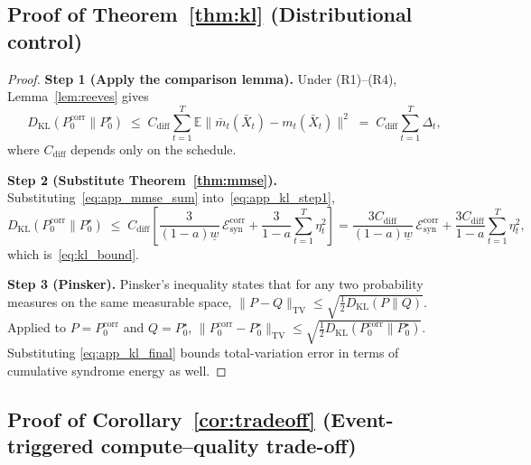 \documentclass{article}
\theoremstyle{plain}
\theoremstyle{definition}
\theoremstyle{remark}
\begin{document}
\subsection{Proof of Theorem~\ref{thm:kl} (Distributional control)}
\label{app:thm_kl}

\begin{proof}
\textbf{Step 1 (Apply the comparison lemma).}
Under (R1)--(R4), Lemma~\ref{lem:reeves} gives
\begin{equation}
D_{\mathrm{KL}}(P_0^{\mathrm{corr}} \| P_0^\star)
\;\le\; C_{\mathrm{diff}} \sum_{t=1}^T
\mathbb{E}\|\bar m_t(\bar X_t) - m_t(\bar X_t)\|^2
\;=\; C_{\mathrm{diff}}\sum_{t=1}^T \Delta_t,
\label{eq:app_kl_step1}
\end{equation}
where \(C_{\mathrm{diff}}\) depends only on the schedule.

\textbf{Step 2 (Substitute Theorem~\ref{thm:mmse}).}
Substituting~\eqref{eq:app_mmse_sum} into~\eqref{eq:app_kl_step1},
\begin{equation}
D_{\mathrm{KL}}(P_0^{\mathrm{corr}} \| P_0^\star)
\;\le\; C_{\mathrm{diff}}\!
  \left[\frac{3}{(1-a)\underline w}\,\mathcal{E}^{\mathrm{corr}}_{\mathrm{syn}}
  + \frac{3}{1-a}\sum_{t=1}^T \eta_t^2\right]
= \frac{3C_{\mathrm{diff}}}{(1-a)\underline w}\,\mathcal{E}^{\mathrm{corr}}_{\mathrm{syn}}
 + \frac{3C_{\mathrm{diff}}}{1-a}\sum_{t=1}^T \eta_t^2,
\label{eq:app_kl_final}
\end{equation}
which is~\eqref{eq:kl_bound}.

\textbf{Step 3 (Pinsker).}
Pinsker's inequality states that for any two probability measures on the
same measurable space,
\(\|P - Q\|_{\mathrm{TV}} \le \sqrt{\tfrac12 D_{\mathrm{KL}}(P\|Q)}\).
Applied to \(P = P_0^{\mathrm{corr}}\) and \(Q = P_0^\star\),
\(\|P_0^{\mathrm{corr}} - P_0^\star\|_{\mathrm{TV}} \le \sqrt{\tfrac12
D_{\mathrm{KL}}(P_0^{\mathrm{corr}} \| P_0^\star)}\). Substituting
\eqref{eq:app_kl_final} bounds total-variation error in terms of cumulative
syndrome energy as well.
\end{proof}

\subsection{Proof of Corollary~\ref{cor:tradeoff}
            (Event-triggered compute--quality trade-off)}
\label{app:cor_tradeoff}
\end{document}
